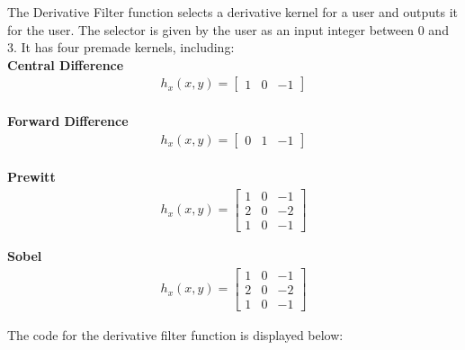 \documentclass{article}
\begin{document}
	The Derivative Filter function selects a derivative kernel for a user and outputs it for the user. The selector is given by the user as an input integer between 0 and 3. It has four premade kernels, including:\\
	
	\textbf{Central Difference}\\
	
	\begin{align*}
	h_{x}(x,y) = \left[
	\begin{matrix}
	1 & 0 & -1
	\end{matrix}
	\right]
	\end{align*}\\
	
	\textbf{Forward Difference}\\
	
	\begin{align*}
	h_{x}(x,y) = \left[
	\begin{matrix}
	0 & 1 & -1
	\end{matrix}
	\right]
	\end{align*}\\
	
	\textbf{Prewitt}\\
	
	\begin{align*}
	h_{x}(x,y) = \left[
	\begin{matrix}
	1 & 0 & -1\\
	2 & 0 & -2\\
	1 & 0 & -1
	\end{matrix}
	\right]
	\end{align*}
	
	\textbf{Sobel}\\
	
	\begin{align*}
	h_{x}(x,y) = \left[
	\begin{matrix}
	1 & 0 & -1\\
	2 & 0 & -2\\
	1 & 0 & -1
	\end{matrix}
	\right]
	\end{align*}
	
	The code for the derivative filter function is displayed below:\\
	
\end{document}
